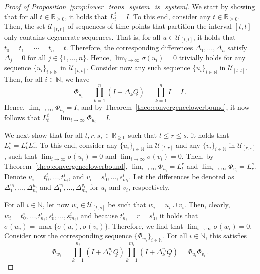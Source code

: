 \documentclass[10pt]{paper}
\theoremstyle{definition}
\newcommand{\nats}{\mathbb{N}}
\newcommand{\reals}{\mathbb{R}}
\newcommand{\realsnonneg}{\reals_{\geq 0}}
\newcommand{\lrate}{\underline{Q}}
\begin{document}
\begin{proof}[Proof of Proposition~\ref{prop:lower_trans_system_is_system}]
We start by showing that for all $t\in\realsnonneg$, it holds that $L_t^t=I$. To this end, consider any $t\in\realsnonneg$. Then, the set $\mathcal{U}_{[t,t]}$ of sequences of time points that partition the interval $[t,t]$ only contains degenerate sequences. That is, for all $u\in\mathcal{U}_{[t,t]}$, it holds that $t_0=t_1=\cdots=t_n=t$. Therefore, the corresponding differences $\Delta_1,\ldots,\Delta_n$ satisfy $\Delta_j=0$ for all $j\in\{1,\ldots,n\}$. Hence, $\lim_{i\to\infty}\sigma(u_i)=0$ trivially holds for any sequence $\{u_i\}_{i\in\nats}$ in $\mathcal{U}_{[t,t]}$. Consider now any such sequence $\{u_i\}_{i\in\nats}$ in $\mathcal{U}_{[t,t]}$. Then, for all $i\in\nats$, we have
\begin{equation*}
\Phi_{u_i} = \prod_{k=1}^n(I+\Delta_k\lrate) = \prod_{k=1}^n I = I\,.
\end{equation*}
Hence, $\lim_{i\to\infty}\Phi_{u_i}=I$, and by Theorem~\ref{theo:convergencelowerbound}, it now follows that $L_t^t=\lim_{i\to\infty}\Phi_{u_i}=I$.

We next show that for all $t,r,s,\in\realsnonneg$ such that $t\leq r\leq s$, it holds that $L_t^s=L_t^rL_r^s$. To this end, consider any $\{u_i\}_{i\in\nats}$ in $\mathcal{U}_{[t,r]}$ and any $\{v_i\}_{i\in\nats}$ in $\mathcal{U}_{[r,s]}$, such that $\lim_{i\to\infty}\sigma(u_i)=0$ and $\lim_{i\to\infty}\sigma(v_i)=0$. Then, by Theorem~\ref{theo:convergencelowerbound}, $\lim_{i\to\infty}\Phi_{u_i}=L_t^r$ and $\lim_{i\to\infty}\Phi_{v_i}=L_r^s$. Denote $u_i=t_0^i,\ldots,t_{n_i}^i$, and $v_i=s_0^i,\ldots,s_{m_i}^i$. Let the differences be denoted as $\Delta_1^{u_i},\ldots,\Delta_{n_i}^{u_i}$ and $\Delta_1^{v_i},\ldots,\Delta_{m_i}^{v_i}$ for $u_i$ and $v_i$, respectively.

For all $i\in\nats$, let now $w_i\in\mathcal{U}_{[t,s]}$ be such that $w_i=u_i\cup v_i$. Then, clearly, $w_i=t_0^i,\ldots,t_{n_i}^i,s_0^i,\ldots,s_{m_i}^i$, and because $t_{n_i}^i=r=s_0^i$, it holds that $\sigma(w_i)=\max\{\sigma(u_i),\sigma(v_i)\}$. Therefore, we find that $\lim_{i\to\infty}\sigma(w_i)=0$. Consider now the corresponding sequence $\{\Phi_{w_i}\}_{i\in\nats}$. For all $i\in\nats$, this satisfies
\begin{equation*}
\Phi_{w_i} = \prod_{k=1}^{n_i}(I+\Delta_{k}^{u_i}\lrate)\prod_{k=1}^{m_i}(I+\Delta_{k}^{v_i}\lrate) = \Phi_{u_i}\Phi_{v_i}\,.
\end{equation*}


\end{proof}
\end{document}
